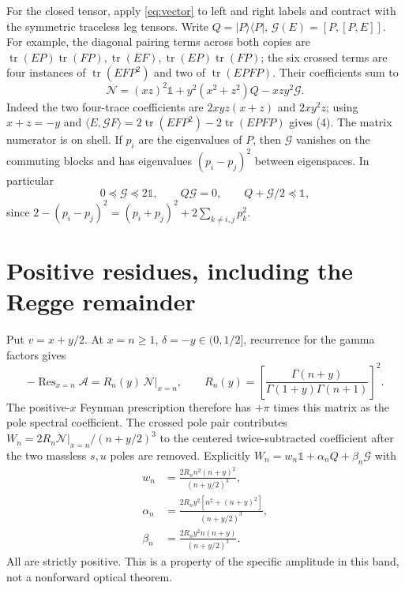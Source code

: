 \documentclass[11pt]{article}
\newcommand{\tr}{\operatorname{tr}}
\newcommand{\Res}{\operatorname{Res}}
\newcommand{\I}{\mathbb 1}
\newcommand{\cA}{\mathcal A}
\begin{document}
For the closed tensor, apply \eqref{eq:vector} to left and right
labels and contract with the symmetric traceless leg tensors. Write
$Q=|P\rangle\langle P|$, $\mathcal G(E)=[P,[P,E]]$.
For example, the diagonal pairing terms across both copies are
$\tr(EP)\tr(FP),\tr(EF),\tr(EP)\tr(FP)$; the six crossed terms
are four instances of $\tr(EF P^2)$ and two of $\tr(EPFP)$.
Their coefficients sum to
\[
 \mathcal N=(xz)^2\I+y^2(x^2+z^2)Q-xzy^2\mathcal G.
 \label{eq:numer}
\tag{4}
\]
Indeed the two four-trace coefficients are $2xyz(x+z)$ and
$2xy^2z$; using $x+z=-y$ and
$\langle E,\mathcal G F\rangle=2\tr(EF P^2)-2\tr(EPFP)$ gives (4).
The matrix numerator is on shell. If $p_i$ are the eigenvalues of $P$,
then $\mathcal G$ vanishes on the commuting blocks and has
eigenvalues $(p_i-p_j)^2$ between eigenspaces. In particular
\begin{equation}
 0\preceq \mathcal G\preceq 2\I,\qquad Q\mathcal G=0,\qquad
 Q+\mathcal G/2\preceq\I,
 \label{eq:geom}
\end{equation}
since $2-(p_i-p_j)^2=(p_i+p_j)^2+
2\sum_{k\ne i,j}p_k^2$.

\section{Positive residues, including the Regge remainder}
Put $v=x+y/2$. At $x=n\ge1$, $\delta=-y\in(0,1/2]$, recurrence
for the gamma factors gives
\[
 -\Res_{x=n}\cA
 =R_n(y)\,\mathcal N\big|_{x=n},\qquad
 R_n(y)=\left[\frac{\Gamma(n+y)}
                  {\Gamma(1+y)\Gamma(n+1)}\right]^2.
\]
The positive-$x$ Feynman prescription therefore has $+\pi$ times
this matrix as the pole spectral coefficient. The crossed pole pair
contributes $W_n=2R_n\mathcal N|_{x=n}/(n+y/2)^3$ to the centered
twice-subtracted coefficient after the two massless $s,u$ poles
are removed. Explicitly $W_n=w_n\I+\alpha_n Q+\beta_n\mathcal G$ with
\begin{equation}
 \begin{split}
 w_n&=\frac{2R_n n^2(n+y)^2}{(n+y/2)^3},\\
 \alpha_n&=\frac{2R_n y^2[n^2+(n+y)^2]}{(n+y/2)^3},\\
 \beta_n&=\frac{2R_n y^2 n(n+y)}{(n+y/2)^3}.
 \end{split}
 \label{eq:weights}
\end{equation}
All are strictly positive. This is a property of the specific
amplitude in this band, not a nonforward optical theorem.
\end{document}
